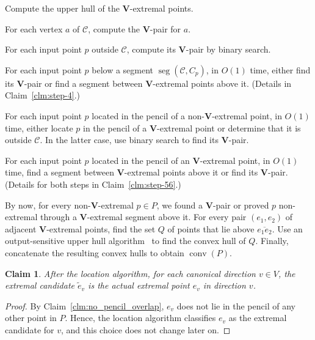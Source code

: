 \documentclass[letterpaper,11pt]{article}
\newtheorem{claim}[theorem]{Claim}
\DeclareMathOperator{\UH}{conv}
\DeclareMathOperator{\seg}{seg}
\newcommand{\cC}{\mathcal{C}}
\begin{document}
\begin{asparaenum}
  \item \label{step-1} 
     Compute the upper hull of the 
     $\textbf{V}$-extremal points.
  \item \label{step-2} 
    For each vertex $a$ of $\cC$, compute the 
    $\textbf{V}$-pair for $a$.
  \item \label{step-3} 
    For each input 
    point $p$ outside $\cC$, compute 
    its $\textbf{V}$-pair by binary search.
  \item \label{step-4} 
    For each input point $p$ 
    below a segment $\seg(\cC,C_p)$, in 
    $O(1)$ time, either find its $\textbf{V}$-pair 
    or find a segment between $\textbf{V}$-extremal
    points above it. (Details in Claim~\ref{clm:step-4}.)
  \item \label{step-5} 
    For each input point 
    $p$ located in the pencil 
    of a non-$\textbf{V}$-extremal point, 
    in $O(1)$ time, either locate $p$ in the pencil of a 
    $\textbf{V}$-extremal point or determine 
    that it is outside $\cC$. In 
    the latter case, use binary search to find its
    $\textbf{V}$-pair.
  \item \label{step-6} 
    For each input 
    point $p$ located in the pencil 
    of an $\textbf{V}$-extremal point, in $O(1)$ 
    time, find a segment between $\textbf{V}$-extremal 
    points above it or find its 
    $\textbf{V}$-pair. (Details for 
    both steps in Claim~\ref{clm:step-56}.)
  \item \label{step-7} 
    By now, for every 
    non-$\textbf{V}$-extremal $p \in P$, 
    we found a $\textbf{V}$-pair or proved 
    $p$ non-extremal through a $\textbf{V}$-extremal 
    segment above it.  For every pair 
    $(e_1, e_2)$ of adjacent $\textbf{V}$-extremal 
    points, find the set $Q$ of points
    that lie above $\overline{e_1e_2}$. 
    Use an output-sensitive 
    upper hull algorithm~\cite{KirkpatrickSe86} to find the convex 
    hull of $Q$. Finally, concatenate the resulting 
    convex hulls to obtain $\UH(P)$. 
\end{asparaenum}

\begin{claim} \label{clm:ext-cand} 
  After the location algorithm, for each
  canonical direction $v \in V$, the extremal candidate 
  $\tilde{e}_v$ is the
  actual extremal point $e_v$ in direction $v$.  
\end{claim}

\begin{proof} 
By Claim~\ref{clm:no_pencil_overlap}, 
$e_v$ does not lie in the pencil of any other
point in $P$. Hence, the location algorithm 
classifies $e_v$ as the extremal candidate for 
$v$, and this choice does 
not change later on.
\end{proof}
\end{document}
